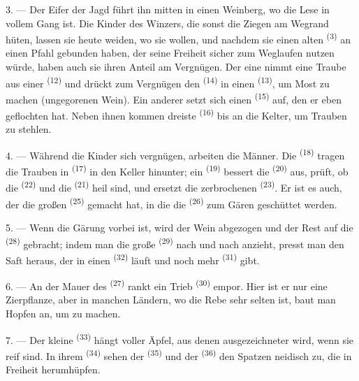 3. --- Der Eifer der Jagd führt ihn mitten in einen Weinberg, wo die Lese in vollem
Gang ist. Die Kinder des Winzers, die sonst die Ziegen am Wegrand hüten, lassen sie
heute weiden, wo sie wollen, und nachdem sie einen alten 
\textsuperscript{(3)} an einen Pfahl gebunden haben, der seine Freiheit sicher zum
Weglaufen nutzen würde, haben auch sie ihren Anteil am Vergnügen. Der eine nimmt
eine Traube aus einer  \textsuperscript{(12)} und drückt zum
Vergnügen den  \textsuperscript{(14)} in einen 
\textsuperscript{(13)}, um Most zu machen (ungegorenen Wein). Ein anderer setzt sich
einen  \textsuperscript{(15)} auf, den er eben geflochten
hat. Neben ihnen kommen dreiste  \textsuperscript{(16)} bis an die
Kelter, um Trauben zu stehlen.

4. --- Während die Kinder sich vergnügen, arbeiten die Männer. Die
 \textsuperscript{(18)} tragen die Trauben in 
\textsuperscript{(17)} in den Keller hinunter; ein 
\textsuperscript{(19)} bessert die  \textsuperscript{(20)} aus, prüft,
ob die  \textsuperscript{(22)} und die 
\textsuperscript{(21)} heil sind, und ersetzt die zerbrochenen 
\textsuperscript{(23)}. Er ist es auch, der die großen 
\textsuperscript{(25)} gemacht hat, in die die 
\textsuperscript{(26)} zum Gären geschüttet werden.

5. --- Wenn die Gärung vorbei ist, wird der Wein abgezogen und der Rest auf die
 \textsuperscript{(28)} gebracht; indem man die große
 \textsuperscript{(29)} nach und nach anzieht, presst man den Saft
heraus, der in einen  \textsuperscript{(32)} läuft und noch mehr
 \textsuperscript{(31)} gibt.

\VUsaut{6.0mm}
\VUsaut{3.4mm}

6. --- An der Mauer des  \textsuperscript{(27)} rankt ein Trieb
 \textsuperscript{(30)} empor. Hier ist er nur eine Zierpflanze, aber
in manchen Ländern, wo die Rebe sehr selten ist, baut man Hopfen an, um
 zu machen.

7. --- Der kleine  \textsuperscript{(33)} hängt voller Äpfel, aus
denen ausgezeichneter  wird, wenn sie reif sind. In ihrem
 \textsuperscript{(34)} sehen der 
\textsuperscript{(35)} und der  \textsuperscript{(36)} den Spatzen
neidisch zu, die in Freiheit herumhüpfen.

